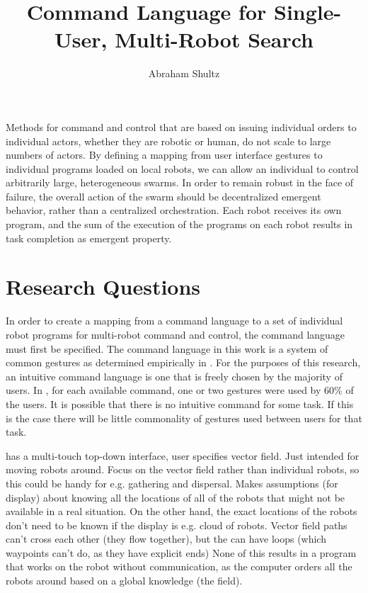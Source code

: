 \documentclass[]{article}
\title{Command Language for Single-User, Multi-Robot Search}
\author{Abraham Shultz}
\begin{document}
\maketitle

\begin{abstract}

\end{abstract}

Methods for command and control that are based on issuing individual orders to individual actors, whether they are robotic or human, do not scale to large numbers of actors. 
By defining a mapping from user interface gestures to individual programs loaded on local robots, we can allow an individual to control arbitrarily large, heterogeneous swarms.
In order to remain robust in the face of failure, the overall action of the swarm should be decentralized emergent behavior, rather than a centralized orchestration. 
Each robot receives its own program, and the sum of the execution of the programs on each robot results in task completion as emergent property.

\section{Research Questions}

In order to create a mapping from a command language to a set of individual robot programs for multi-robot command and control, the command language must first be specified. 
The command language in this work is a system of common gestures as determined empirically in \cite{Micire:2009:ANG:1731903.1731912}. 
For the purposes of this research, an intuitive command language is one that is freely chosen by the majority of users. 
In \cite{Micire:2009:ANG:1731903.1731912}, for each available command, one or two gestures were used by 60\% of the users. 
It is possible that there is no intuitive command for some task. 
If this is the case there will be little commonality of gestures used between users for that task.

\cite{Kato:2009:MIC:1520340.1520500} has a multi-touch top-down interface, user specifies vector field. Just intended for moving robots around. Focus on the vector field rather than individual robots, so this could be handy for e.g. gathering and dispersal. Makes assumptions (for display) about knowing all the locations of all of the robots that might not be available in a real situation. On the other hand, the exact locations of the robots don't need to be known if the display is e.g. cloud of robots. Vector field paths can't cross each other (they flow together), but the can have loops (which waypoints can't do, as they have explicit ends) None of this results in a program that works on the robot without communication, as the computer orders all the robots around based on a global knowledge (the field).
\end{document}

